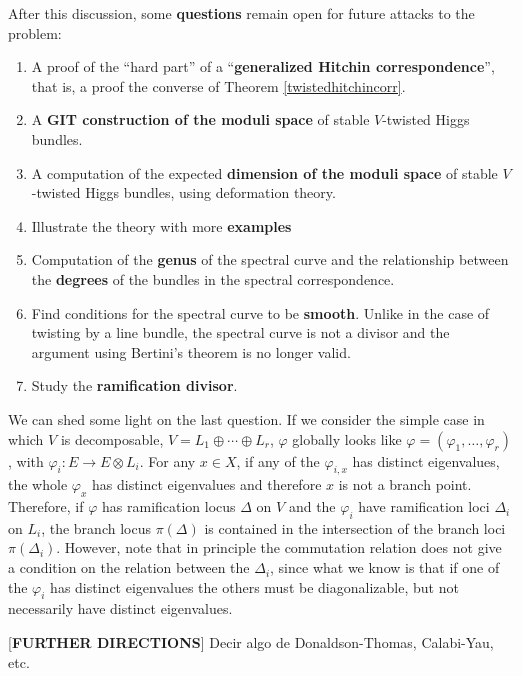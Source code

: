 \documentclass[12pt,a4paper]{book}
\theoremstyle{definition} \newtheorem{defn}[thm]{Definition}
\theoremstyle{definition} \newtheorem{ejemplo}[thm]{Example}
\theoremstyle{remark} \newtheorem{rem}[thm]{Remark}
\begin{document}
  After this discussion, some \textbf{questions} remain open for future attacks to the problem:
  \begin{enumerate}
    \item A proof of the ``hard part'' of a ``\textbf{generalized Hitchin correspondence}'', that is, a proof the converse of Theorem \ref{twistedhitchincorr}.
    \item A \textbf{GIT construction of the moduli space} of stable $V$-twisted Higgs bundles.
    \item A computation of the expected \textbf{dimension of the moduli space} of stable $V$-twisted Higgs bundles, using deformation theory.
    \item Illustrate the theory with more \textbf{examples}
    \item Computation of the \textbf{genus} of the spectral curve and the relationship between the \textbf{degrees} of the bundles in the spectral correspondence.
    \item Find conditions for the spectral curve to be \textbf{smooth}. Unlike in the case of twisting by a line bundle, the spectral curve is not a divisor and the argument using Bertini's theorem is no longer valid.
    \item Study the \textbf{ramification divisor}.
  \end{enumerate}

  We can shed some light on the last question. If we consider the simple case in which $V$ is decomposable, $V=L_1 \oplus \cdots \oplus L_r$, $\varphi$ globally looks like $\varphi=(\varphi_1,\dots,\varphi_r)$, with $\varphi_i: E\rightarrow E\otimes L_i$. For any $x\in X$, if any of the $\varphi_{i,x}$ has distinct eigenvalues, the whole $\varphi_x$ has distinct eigenvalues and therefore $x$ is not a branch point. Therefore, if $\varphi$ has ramification locus $\Delta$ on $V$ and the $\varphi_i$ have ramification loci $\Delta_i$ on $L_i$, the branch locus $\pi(\Delta)$ is contained in the intersection of the branch loci $\pi(\Delta_i)$. However, note that in principle the commutation relation does not give a condition on the relation between the $\Delta_i$, since what we know is that if one of the $\varphi_i$ has distinct eigenvalues the others must be diagonalizable, but not necessarily have distinct eigenvalues.


  [\textbf{FURTHER DIRECTIONS}] Decir algo de Donaldson-Thomas, Calabi-Yau, etc.

\newpage\null\thispagestyle{empty}
\nocite{*}


\end{document}

